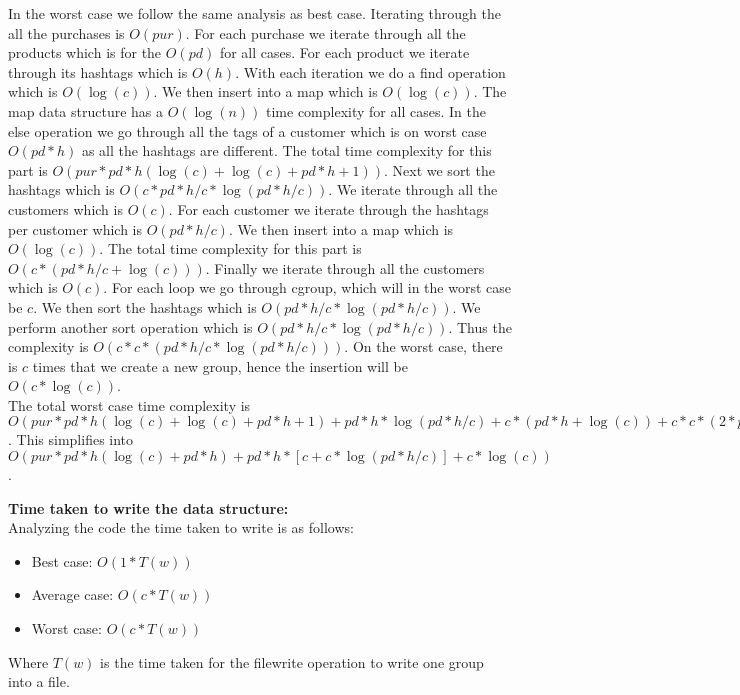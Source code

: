 \documentclass[12pt]{article}
\begin{document}
\begin{itemize}
    In the worst case we follow the same analysis as best case. Iterating through the all the purchases is $O(pur)$. For each purchase we iterate through all the products which is for the $O(pd)$ for all cases. For each product we iterate through its hashtags which is $O(h)$. With each iteration we do a find operation which is $O(\log(c))$. We then insert into a map which is $O(\log(c))$. The map data structure has a $O(\log(n))$ time complexity for all cases. In the else operation we go through all the tags of a customer which is on worst case $O(pd*h)$ as all the hashtags are different. The total time complexity for this part is $O(pur*pd*h(\log(c) + \log(c) + pd*h + 1))$. Next we sort the hashtags which is $O(c*pd*h/c*\log(pd*h/c))$. We iterate through all the customers which is $O(c)$. For each customer we iterate through the hashtags per customer which is $O(pd*h/c)$. We then insert into a map which is $O(\log(c))$. The total time complexity for this part is $O(c*(pd*h/c + \log(c)))$. Finally we iterate through all the customers which is $O(c)$. For each loop we go through cgroup, which will in the worst case be $c$. We then sort the hashtags which is $O(pd*h/c*\log(pd*h/c))$. We perform another sort operation which is $O(pd*h/c*\log(pd*h/c))$. Thus the complexity is $O(c*c*(pd*h/c * \log(pd*h/c)))$. On the worst case, there is $c$ times that we create a new group, hence the insertion will be $O(c*\log(c))$.\\
    The total worst case time complexity is $O(pur*pd*h(\log(c) + \log(c) + pd*h + 1) + pd*h*\log(pd*h/c) + c * (pd*h + \log(c)) + c*c*(2 * pd*h/c * \log(pd*h/c)) + c*\log(c))$. This simplifies into $O(pur*pd*h(\log(c) + pd*h) + pd*h*[c + c * \log(pd*h/c)] + c * \log(c))$.
\end{itemize}

\textbf{Time taken to write the data structure:}\\
Analyzing the code the time taken to write is as follows:
\begin{itemize}
    \item Best case: $O(1 * T(w))$
    \item Average case: $O(c * T(w))$
    \item Worst case: $O(c * T(w))$
\end{itemize}
Where $T(w)$ is the time taken for the filewrite operation to write one group into a file.\\
\end{document}
